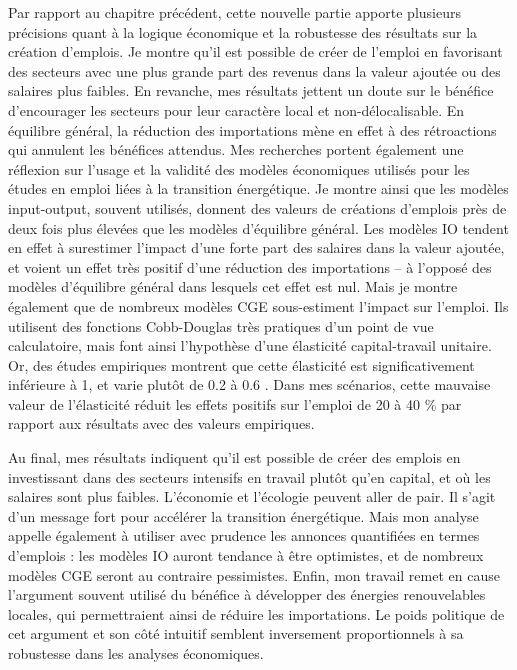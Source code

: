 Par rapport au chapitre précédent, cette nouvelle partie apporte plusieurs précisions quant à la logique économique et la robustesse des résultats sur la création d’emplois. 
Je montre qu’il est possible de créer de l’emploi en favorisant des secteurs avec une plus grande part des revenus dans la valeur ajoutée ou des salaires plus faibles. En revanche, mes résultats jettent un doute sur le bénéfice d’encourager les secteurs pour leur caractère local et non-délocalisable. En équilibre général, la réduction des importations mène en effet à des rétroactions qui annulent les bénéfices attendus.
Mes recherches portent également une réflexion sur l’usage et la validité des modèles économiques utilisés pour les études en emploi liées à la transition énergétique. Je montre ainsi que les modèles input-output, souvent utilisés, donnent des valeurs de créations d’emplois près de deux fois plus élevées que les modèles d’équilibre général. Les modèles IO tendent en effet à surestimer l’impact d’une forte part des salaires dans la valeur ajoutée, et voient un effet très positif d’une réduction des importations – à l’opposé des modèles d’équilibre général dans lesquels cet effet est nul.
Mais je montre également que de nombreux modèles CGE sous-estiment l’impact sur l’emploi. Ils utilisent des fonctions Cobb-Douglas très pratiques d’un point de vue calculatoire, mais font ainsi l’hypothèse d’une élasticité capital-travail unitaire. Or, des études empiriques montrent que cette élasticité est significativement inférieure à 1, et varie plutôt de 0.2 à 0.6 \citep{VanderWerf2008}. Dans mes scénarios, cette mauvaise valeur de l’élasticité réduit les effets positifs sur l’emploi de 20 à 40 \% par rapport aux résultats avec des valeurs empiriques. 

Au final, mes résultats indiquent qu’il est possible de créer des emplois en investissant dans des secteurs intensifs en travail plutôt qu’en capital, et où les salaires sont plus faibles. L'économie et l'écologie peuvent aller de pair. Il s’agit d’un message fort pour accélérer la transition énergétique.
Mais mon analyse appelle également à utiliser avec prudence les annonces quantifiées en termes d’emplois : les modèles IO auront tendance à être optimistes, et de nombreux modèles CGE seront au contraire pessimistes.
Enfin, mon travail remet en cause l’argument souvent utilisé du bénéfice à développer des énergies renouvelables locales, qui permettraient ainsi de réduire les importations. Le poids politique de cet argument et son côté intuitif semblent inversement proportionnels à sa robustesse dans les analyses économiques.


